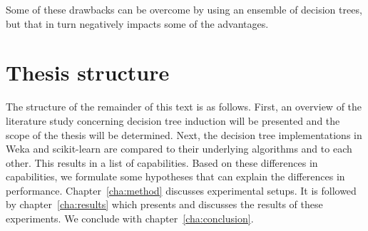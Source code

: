 Some of these drawbacks can be overcome by using an ensemble of decision trees, but that in turn negatively impacts some of the advantages.

\section{Thesis structure}
The structure of the remainder of this text is as follows. First, an overview of the literature study concerning decision tree induction will be presented and the scope of the thesis will be determined. Next, the decision tree implementations in Weka and scikit-learn are compared to their underlying algorithms and to each other. This results in a list of capabilities. Based on these differences in capabilities, we formulate some hypotheses that can explain the differences in performance. Chapter~\ref{cha:method} discusses experimental setups. It is followed by chapter~\ref{cha:results} which presents and discusses the results of these experiments. We conclude with chapter~\ref{cha:conclusion}.

